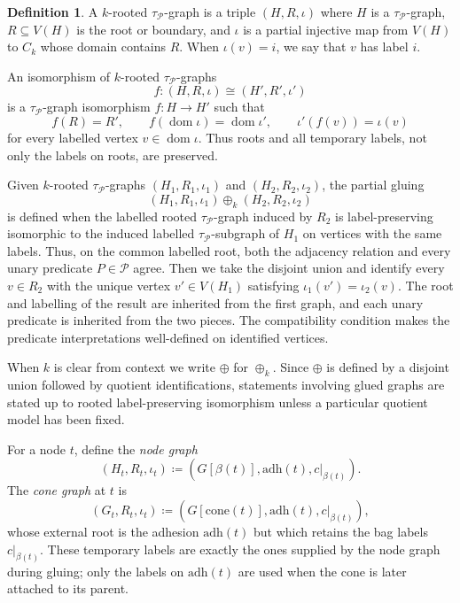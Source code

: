 \documentclass[11pt]{article}
\theoremstyle{definition}
\newtheorem{definition}{Definition}[section]
\newcommand{\defeq}{\coloneqq}
\newcommand{\adh}{\mathrm{adh}}
\newcommand{\cone}{\mathrm{cone}}
\newcommand{\Pred}{\mathcal P}
\begin{document}
\begin{definition}
A \(k\)-rooted \(\tau_{\Pred}\)-graph is a triple \((H,R,\iota)\) where \(H\) is a
\(\tau_{\Pred}\)-graph, \(R\subseteq V(H)\) is the root or boundary, and
\(\iota\) is a partial injective map from \(V(H)\) to \(C_k\) whose domain
contains \(R\).  When \(\iota(v)=i\), we say that \(v\) has label \(i\).
\end{definition}

An isomorphism of \(k\)-rooted \(\tau_{\Pred}\)-graphs
\[
  f:(H,R,\iota)\cong (H',R',\iota')
\]
is a \(\tau_{\Pred}\)-graph isomorphism \(f:H\to H'\) such that
\[
  f(R)=R',\qquad f(\operatorname{dom}\iota)=\operatorname{dom}\iota',
  \qquad \iota'(f(v))=\iota(v)
\]
for every labelled vertex \(v\in\operatorname{dom}\iota\).  Thus roots and all
temporary labels, not only the labels on roots, are preserved.

Given \(k\)-rooted \(\tau_{\Pred}\)-graphs \((H_1,R_1,\iota_1)\) and
\((H_2,R_2,\iota_2)\), the partial gluing
\[
  (H_1,R_1,\iota_1)\oplus_k(H_2,R_2,\iota_2)
\]
is defined when the labelled rooted \(\tau_{\Pred}\)-graph induced by \(R_2\) is
label-preserving isomorphic to the induced labelled \(\tau_{\Pred}\)-subgraph of
\(H_1\) on vertices with the same labels.  Thus, on the common labelled root,
both the adjacency relation and every unary predicate \(P\in\Pred\) agree.  Then
we take the disjoint union and identify every \(v\in R_2\) with the unique vertex
\(v'\in V(H_1)\) satisfying \(\iota_1(v')=\iota_2(v)\).  The root and labelling of
the result are inherited from the first graph, and each unary predicate is
inherited from the two pieces.  The compatibility condition makes the predicate
interpretations well-defined on identified vertices.

When \(k\) is clear from context we write \(\oplus\) for \(\oplus_k\).  Since
\(\oplus\) is defined by a disjoint union followed by quotient identifications,
statements involving glued graphs are stated up to rooted label-preserving
isomorphism unless a particular quotient model has been fixed.

For a node \(t\), define the \emph{node graph}
\[
  (H_t,R_t,\iota_t)
  \defeq (G[\beta(t)],\adh(t),c|_{\beta(t)}).
\]
The \emph{cone graph} at \(t\) is
\[
  (G_t,R_t,\iota_t) \defeq (G[\cone(t)],\adh(t),c|_{\beta(t)}),
\]
whose external root is the adhesion \(\adh(t)\) but which retains the bag labels
\(c|_{\beta(t)}\).  These temporary labels are exactly the ones supplied by the
node graph during gluing; only the labels on \(\adh(t)\) are used when the cone
is later attached to its parent.
\end{document}
